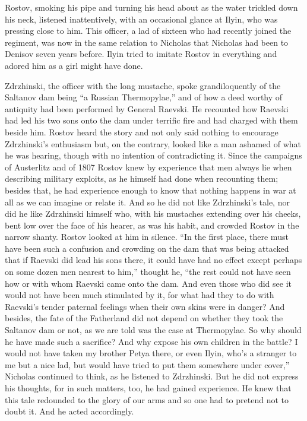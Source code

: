 Rostov, smoking his pipe and turning his head about as the water
trickled down his neck, listened inattentively, with an
occasional glance at Ilyin, who was pressing close to him. This
officer, a lad of sixteen who had recently joined the regiment,
was now in the same relation to Nicholas that Nicholas had been
to Denisov seven years before. Ilyin tried to imitate Rostov in
everything and adored him as a girl might have done.

Zdrzhinski, the officer with the long mustache, spoke
grandiloquently of the Saltanov dam being ``a Russian
Thermopylae,'' and of how a deed worthy of antiquity had been
performed by General Raevski. He recounted how Raevski had led
his two sons onto the dam under terrific fire and had charged
with them beside him. Rostov heard the story and not only said
nothing to encourage Zdrzhinski's enthusiasm but, on the
contrary, looked like a man ashamed of what he was hearing,
though with no intention of contradicting it. Since the campaigns
of Austerlitz and of 1807 Rostov knew by experience that men
always lie when describing military exploits, as he himself had
done when recounting them; besides that, he had experience enough
to know that nothing happens in war at all as we can imagine or
relate it. And so he did not like Zdrzhinski's tale, nor did he
like Zdrzhinski himself who, with his mustaches extending over
his cheeks, bent low over the face of his hearer, as was his
habit, and crowded Rostov in the narrow shanty. Rostov looked at
him in silence. ``In the first place, there must have been such a
confusion and crowding on the dam that was being attacked that if
Raevski did lead his sons there, it could have had no effect
except perhaps on some dozen men nearest to him,'' thought he,
``the rest could not have seen how or with whom Raevski came onto
the dam. And even those who did see it would not have been much
stimulated by it, for what had they to do with Raevski's tender
paternal feelings when their own skins were in danger?  And
besides, the fate of the Fatherland did not depend on whether
they took the Saltanov dam or not, as we are told was the case at
Thermopylae. So why should he have made such a sacrifice? And why
expose his own children in the battle? I would not have taken my
brother Petya there, or even Ilyin, who's a stranger to me but a
nice lad, but would have tried to put them somewhere under
cover,'' Nicholas continued to think, as he listened to
Zdrzhinski. But he did not express his thoughts, for in such
matters, too, he had gained experience. He knew that this tale
redounded to the glory of our arms and so one had to pretend not
to doubt it. And he acted accordingly.

